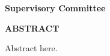 \newcommand\panelist[3]{\noindent #1, #2\\\noindent(#3)\tpbreak}

\newpage
{}

\noindent \textbf{Supervisory Committee}
\tpbreak
\panel

\begin{center}
\textbf{ABSTRACT}
\end{center}

Abstract here.
